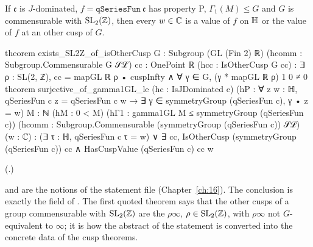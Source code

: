 \begin{theorem}\label{ch19:thm:surj}
If $\mathfrak c$ is $J$-dominated, $f=\mathtt{qSeriesFun}\ \mathfrak c$ has property P, $\Gamma_1(M)\le G$ and $G$ is commensurable with $\mathrm{SL}_2(\mathbb{Z})$, then every $w\in{\mathbb{C}}$ is a value of $f$ on
$\mathbb{H}$ or the value of $f$ at an other cusp of $G$.
\end{theorem}
\begin{leancode}
theorem exists_SL2Z_of_isOtherCusp {G : Subgroup (GL (Fin 2) ℝ)}
    (hcomm : Subgroup.Commensurable G 𝒮ℒ) {cc : OnePoint ℝ} (hcc : IsOtherCusp G cc) :
    ∃ ρ : SL(2, ℤ), cc = mapGL ℝ ρ • cuspInfty ∧ ∀ γ ∈ G, (γ * mapGL ℝ ρ) 1 0 ≠ 0
theorem surjective_of_gamma1GL_le (hc : IsJDominated c)
    (hP : ∀ z w : ℍ, qSeriesFun c z = qSeriesFun c w →
      ∃ γ ∈ symmetryGroup (qSeriesFun c), γ • z = w)
    {M : ℕ} (hM : 0 < M) (hΓ1 : gamma1GL M ≤ symmetryGroup (qSeriesFun c))
    (hcomm : Subgroup.Commensurable (symmetryGroup (qSeriesFun c)) 𝒮ℒ) (w : ℂ) :
    (∃ τ : ℍ, qSeriesFun c τ = w) ∨
      ∃ cc, IsOtherCusp (symmetryGroup (qSeriesFun c)) cc ∧ HasCuspValue (qSeriesFun c) cc w
\end{leancode}
(.)
\begin{dictionary}
 and  are the notions of the statement file (Chapter~\ref{ch:16}).  The conclusion is exactly the field
 of .  The first quoted theorem says that the other cusps of a group commensurable with
$\mathrm{SL}_2(\mathbb{Z})$ are the $\rho\infty$, $\rho\in\mathrm{SL}_2(\mathbb{Z})$, with $\rho\infty$ not $G$-equivalent to $\infty$; it is how the abstract  of the
statement is converted into the concrete data of the cusp theorems.
\end{dictionary}
